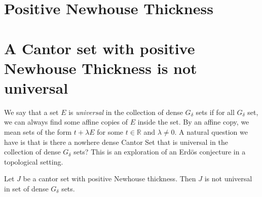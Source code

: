 \section{Positive Newhouse Thickness}



\section{A Cantor set with positive Newhouse Thickness is not universal}
We  say that a set $E$ is  {\it universal} in the collection of dense $G_{\delta}$ sets if for all $G_{\delta}$ set,  we can  always find some affine copies of $E$ inside the set. By an affine copy, we  mean sets of  the form $t+\lambda E$ for some $t\in{\mathbb R}$ and $\lambda\ne 0$. A natural question we have is that  is there a nowhere dense Cantor Set that is universal in the collection of dense $G_\delta$ sets? This is an exploration of an Erd\"{o}s conjecture in a topological setting. 

\begin{theorem}\label{theorem_positive_NW}
Let $J$ be a cantor set with positive Newhouse thickness.  Then $J$ is not universal in set of dense $G_\delta$ sets.
\end{theorem}

